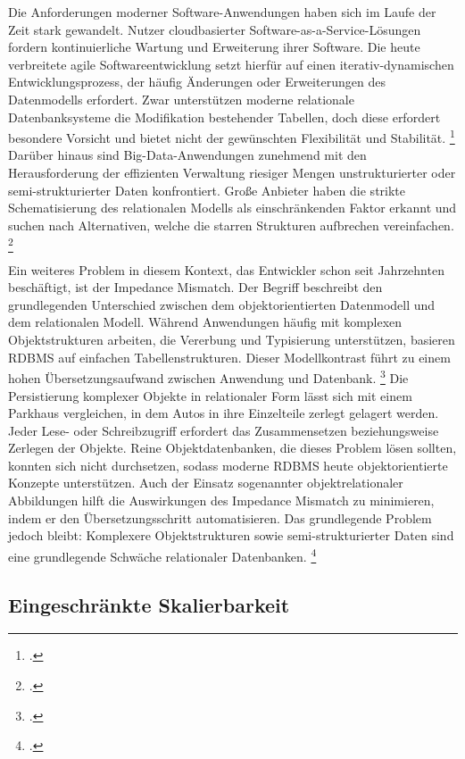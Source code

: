 Die Anforderungen moderner Software-Anwendungen haben sich im Laufe der Zeit stark gewandelt. Nutzer cloudbasierter Software-as-a-Service-Lösungen fordern kontinuierliche Wartung und Erweiterung ihrer Software. Die heute verbreitete agile Softwareentwicklung setzt hierfür auf einen iterativ-dynamischen Entwicklungsprozess, der häufig  Änderungen oder Erweiterungen des Datenmodells erfordert. Zwar unterstützen moderne relationale Datenbanksysteme die Modifikation bestehender Tabellen, doch diese erfordert besondere Vorsicht und bietet nicht der gewünschten Flexibilität und Stabilität. \footcite[S. 197]{harrisonNextGenerationDatabases2015} Darüber hinaus sind Big-Data-Anwendungen zunehmend mit den Herausforderung der effizienten Verwaltung riesiger Mengen unstrukturierter oder semi-strukturierter Daten konfrontiert. Große Anbieter haben die strikte Schematisierung des relationalen Modells als einschränkenden Faktor erkannt und suchen nach Alternativen, welche die starren Strukturen aufbrechen vereinfachen. \footcite[S. 175]{chenBigDataSurvey2014}


Ein weiteres Problem in diesem Kontext, das Entwickler schon seit Jahrzehnten beschäftigt, ist der Impedance Mismatch. Der Begriff beschreibt den grundlegenden Unterschied zwischen dem objektorientierten Datenmodell und dem relationalen Modell. Während Anwendungen häufig mit komplexen Objektstrukturen arbeiten, die Vererbung und Typisierung unterstützen, basieren RDBMS auf einfachen Tabellenstrukturen. Dieser Modellkontrast führt zu einem hohen Übersetzungsaufwand zwischen Anwendung und Datenbank. \footcite{newardVietnamComputerScience2006} Die Persistierung komplexer Objekte in relationaler Form lässt sich mit einem Parkhaus vergleichen, in dem Autos in ihre Einzelteile zerlegt gelagert werden. Jeder Lese- oder Schreibzugriff erfordert das Zusammensetzen beziehungsweise Zerlegen der Objekte. Reine Objektdatenbanken, die dieses Problem lösen sollten, konnten sich nicht durchsetzen, sodass moderne RDBMS heute objektorientierte Konzepte unterstützen. Auch der Einsatz sogenannter objektrelationaler Abbildungen hilft die Auswirkungen des Impedance Mismatch zu minimieren, indem er den Übersetzungsschritt automatisieren. Das grundlegende Problem jedoch bleibt: Komplexere Objektstrukturen sowie semi-strukturierter Daten sind eine grundlegende Schwäche relationaler Datenbanken. \footcite[S. 13]{harrisonNextGenerationDatabases2015}

\subsection{Eingeschränkte Skalierbarkeit}

